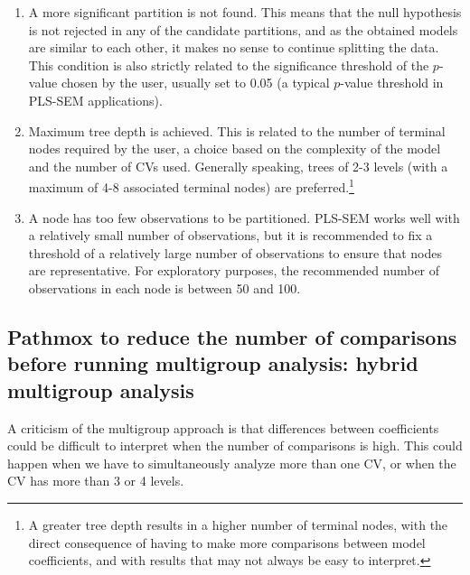 \begin{enumerate}
\item A more significant partition is not found. This means that the null hypothesis is not rejected in any of the candidate partitions, and as the obtained models are similar to each other, it makes no sense to continue splitting the data. This condition is also strictly related to the significance threshold of the $p$-value chosen by the user, usually set to 0.05 (a typical $p$-value threshold in PLS-SEM applications).

\item Maximum tree depth is achieved. This is related to the number of terminal nodes required by the user, a choice based on the complexity of the model and the number of CVs used. Generally speaking, trees of 2-3 levels (with a maximum of 4-8 associated terminal nodes) are preferred.\footnote{A greater tree depth results in a higher number of terminal nodes, with the direct consequence of having to make more comparisons between model coefficients, and with results that may not always be easy to interpret.}

\item A node has too few observations to be partitioned. PLS-SEM works well with a relatively small number of observations, but it is recommended to fix a threshold of a relatively large number of observations to ensure that nodes are representative. For exploratory purposes, the recommended number of observations in each node is between 50 and 100.  

\end{enumerate}

\subsection{Pathmox to reduce the number of comparisons before running multigroup analysis: hybrid multigroup analysis}

A criticism of the multigroup approach is that differences between coefficients could be difficult to interpret when the number of comparisons is high.  This could happen when we have to simultaneously analyze more than one CV, or when the CV has more than 3 or 4 levels. 

